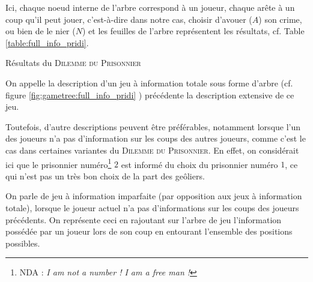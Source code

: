\documentclass{cours}
\begin{document}
Ici, chaque noeud interne de l'arbre correspond à un joueur, chaque arête à un coup qu'il peut jouer, c'est-à-dire dans notre cas, choisir d'avouer ($A$) son crime, ou bien de le nier ($N$) et les feuilles de l'arbre représentent les résultats, cf. Table \ref{table:full_info_pridi}.\\
\begin{table}[ht]
    \centering
    \caption{Résultats du \textsc{Dilemme du Prisonnier}}
    \label{table:full_info_pridi}
\end{table}
\begin{definition}
    On appelle la description d'un jeu à information totale sous forme d'arbre (cf. figure \ref{fig:gametree:full_info_pridi} ) précédente la description extensive de ce jeu.
\end{definition}

Toutefois, d'autre descriptions peuvent être préférables, notamment lorsque l'un des joueurs n'a pas d'information sur les coups des autres joueurs, comme c'est le cas dans certaines variantes du \textsc{Dilemme du Prisonnier}. En effet, on considérait ici que le prisonnier numéro\footnote{NDA : \textit{I am not a number ! I am a free man !}} $2$ est informé du choix du prisonnier numéro $1$, ce qui n'est pas un très bon choix de la part des geôliers.
\begin{definition}
    On parle de jeu à information imparfaite (par opposition aux jeux à information totale), lorsque le joueur actuel n'a pas d'informations sur les coups des joueurs précédents. On représente ceci en rajoutant sur l'arbre de jeu l'information possédée par un joueur lors de son coup en entourant l'ensemble des positions possibles.
\end{definition}
\end{document}
